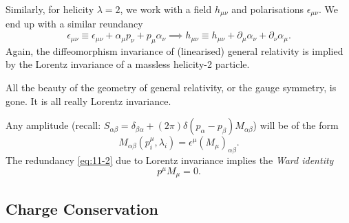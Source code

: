 Similarly, for  helicity $\lambda = 2$, we work with a field $h_{\mu\nu}$ and polarisations $\epsilon_{\mu\nu}$. We end up with a similar reundancy
\begin{equation}
  \epsilon_{\mu\nu} \equiv \epsilon_{\mu\nu} + \alpha_{\mu} p_{\nu} + p_{\mu} \alpha_{\nu} \implies h_{\mu\nu} \equiv h_{\mu\nu} + \partial_{\mu} \alpha_{\nu} + \partial_{\nu} \alpha_{\mu}.
\end{equation}
Again, the diffeomorphism invariance of (linearised) general relativity is implied by the Lorentz invariance of a massless helicity-2 particle.

All the beauty of the geometry of general relativity, or the gauge symmetry, is gone. It is all really Lorentz invariance.

Any amplitude (recall: $S_{\alpha\beta} = \delta_{\beta\alpha} + (2\pi) \delta (p_\alpha - p_{\beta}) M_{\alpha\beta}$) will be of the form
\begin{equation}
  M_{\alpha\beta} (p^{\mu}_i, \lambda_i) = \epsilon^{\mu} (M_{\mu})_{\alpha\beta}.
\end{equation}
The redundancy \eqref{eq:11-2} due to Lorentz invariance implies the \emph{Ward identity}
\begin{equation}
  \boxed{p^{\mu} M_{\mu} = 0}.
\end{equation}

\subsection{Charge Conservation}%
\label{sub:charge_conservation}

